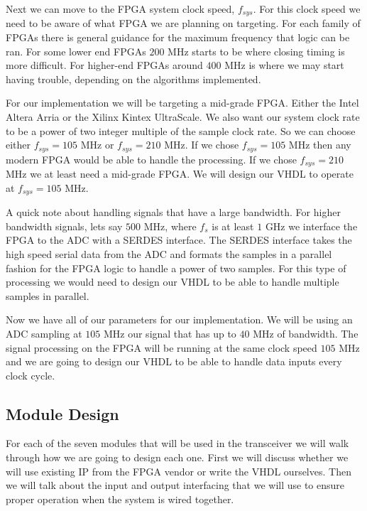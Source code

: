 Next we can move to the \ac{FPGA} system clock speed, $f_{sys}$. For this clock speed we need to be aware of what \ac{FPGA} we are planning on targeting. For each family of \ac{FPGA}s there is general guidance for the maximum frequency that logic can be ran. For some lower end \ac{FPGA}s $200$ \ac{MHz} starts to be where closing timing is more difficult. For higher-end \ac{FPGA}s around $400$ \ac{MHz} is where we may start having trouble, depending on the algorithms implemented.

For our implementation we will be targeting a mid-grade \ac{FPGA}. Either the Intel Altera Arria or the Xilinx Kintex UltraScale. We also want our system clock rate to be a power of two integer multiple of the sample clock rate. So we can choose either $f_{sys} = 105$ \ac{MHz} or $f_{sys} = 210$ \ac{MHz}. If we chose $f_{sys} = 105$ \ac{MHz} then any modern \ac{FPGA} would be able to handle the processing. If we chose $f_{sys} = 210$ \ac{MHz} we at least need a mid-grade \ac{FPGA}. We will design our \ac{VHDL} to operate at $f_{sys} = 105$ \ac{MHz}.

A quick note about handling signals that have a large bandwidth. For higher bandwidth signals, lets say $500$ \ac{MHz}, where $f_s$ is at least $1$ \ac{GHz} we interface the \ac{FPGA} to the \ac{ADC} with a \ac{SERDES} interface. The \ac{SERDES} interface takes the high speed serial data from the \ac{ADC} and formats the samples in a parallel fashion for the \ac{FPGA} logic to handle a power of two samples. For this type of processing we would need to design our \ac{VHDL} to be able to handle multiple samples in parallel.

Now we have all of our parameters for our implementation. We will be using an \ac{ADC} sampling at $105$ \ac{MHz} our signal that has up to $40$ \ac{MHz} of bandwidth. The signal processing on the \ac{FPGA} will be running at the same clock speed $105$ \ac{MHz} and we are going to design our \ac{VHDL} to be able to handle data inputs every clock cycle.

\subsection{Module Design}

For each of the seven modules that will be used in the transceiver we will walk through how we are going to design each one. First we will discuss whether we will use existing \ac{IP} from the \ac{FPGA} vendor or write the \ac{VHDL} ourselves. Then we will talk about the input and output interfacing that we will use to ensure proper operation when the system is wired together. 

